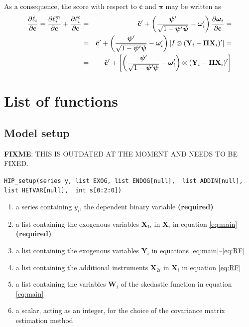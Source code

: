 \documentclass[a4paper,10pt]{article}
\newenvironment{funcdoc}[1]
{\noindent\hrulefill\newline\texttt{#1}\par\noindent\hrulefill\par\medskip\par}
{\bigskip}
\newcommand{\pder}[2]{\ensuremath\frac{\partial #1}{\partial #2}}
\newcommand{\Endog}{\mathbf{Y}_{i}}
\newcommand{\Exog}{\mathbf{X}_{1i}}
\newcommand{\Inst}{\mathbf{X}_{2i}}
\newcommand{\ExoInst}{\mathbf{X}_{i}}
\newcommand{\CSReg}{\mathbf{W}_{i}}
\newcommand{\ScRfDist}{\bm{\omega}_i}
\newcommand{\RfPar}{\bm{\Pi}}
\newcommand{\vRfPar}{\bm{\pi}}
\newcommand{\ScCov}{\bm{\psi}}
\newcommand{\vechC}{\mathbf{c}}
\begin{document}
As a consequence, the score with respect to $\vechC$ and $\vRfPar$ may
be written as
\begin{eqnarray*}
  \pder{\ell_i}{\vechC} = \pder{\ell^m_i}{\vechC} +
  \pder{\ell^c_i}{\vechC} &=&
  \tilde{\mathbf{c}}' +
  \left( \frac{\ScCov'}{\sqrt{1- \ScCov'\ScCov}} - \ScRfDist'\right)
  \pder{\ScRfDist}{\vechC} = \\
  & = & \tilde{\mathbf{c}}' +
  \left( \frac{\ScCov'}{\sqrt{1- \ScCov'\ScCov}} - \ScRfDist'\right)
  \left[I \otimes (\Endog - \RfPar \ExoInst)' \right] = \\
  & = & \tilde{\mathbf{c}}' +
  \left[
    \left( \frac{\ScCov'}{\sqrt{1- \ScCov'\ScCov}} - \ScRfDist'\right)
    \otimes (\Endog - \RfPar \ExoInst)' 
  \right] \\
\end{eqnarray*}

\section{List of functions}
\label{sec:syntax}
\subsection{Model setup}
\label{sec:gig_setup}

\smallskip
\textbf{FIXME}: THIS IS OUTDATED AT THE MOMENT AND NEEDS TO BE FIXED.
\smallskip


\begin{funcdoc}{HIP\_setup(series y, list EXOG, list ENDOG[null], \
			  list ADDIN[null], list HETVAR[null], \
			  int s[0:2:0])}
\begin{enumerate}
\item a series containing $y_i$, the dependent binary variable 
\textbf{(required)}
\item a list containing the exogenous variables $\Exog$ in $\ExoInst$
in equation \eqref{eq:main} \textbf{(required)}
\item a list containing the exogenous variables $\Endog$ in equations
\eqref{eq:main}--\eqref{eq:RF}
\item a list containing the additional instruments $\Inst$ in $\ExoInst$
in equation \eqref{eq:RF}
\item a list containing the variables $\CSReg$ of the skedastic function
in equation \eqref{eq:main}
\item a scalar, acting as an integer, for the choice of the covariance
  matrix estimation method
\end{enumerate}
\end{funcdoc}
\end{document}
